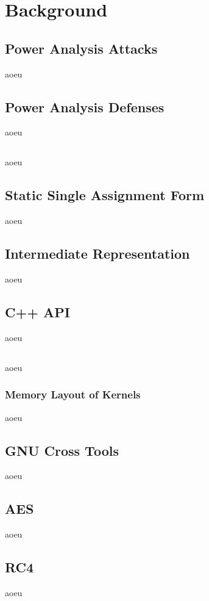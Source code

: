 \section{Background}
\label{background}

\subsection{Power Analysis Attacks}
aoeu

\subsection{Power Analysis Defenses}
aoeu

\subsection{\llvm{}}
\label{llvm}
aoeu

\subsection{Static Single Assignment Form}
\label{ssa}
aoeu

\subsection{\llvm{} Intermediate Representation}
\label{ir}
aoeu

\subsection{\llvm{} C++ API}
\label{api}
aoeu

\subsection{\qemu{}}
aoeu

\subsubsection{Memory Layout of \qemu{} Kernels}
\label{memory}
aoeu

\subsection{GNU Cross Tools}
aoeu

\subsection{AES}
aoeu

\subsection{RC4}
aoeu
